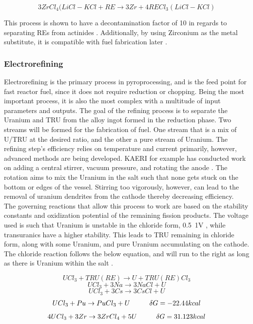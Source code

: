 \[ 3ZrCl_4(LiCl-KCl + RE \rightarrow 3Zr + 4RECl_3(LiCl-KCl) \]

This process is shown to have a decontamination factor of 10 in regards to separating REs from actinides \cite{sakamura}. Additionally, by using Zirconium as the metal substitute, it is compatible with fuel fabrication later \cite{ohta}.
\subsubsection{Electrorefining}
Electrorefining is the primary process in pyroprocessing, and is the feed point for fast reactor fuel, since it does not require reduction or chopping.
Being the most important process, it is also the most complex with a multitude of input parameters and outputs. 
The goal of the refining process is to separate the Uranium and TRU from the alloy ingot formed in the reduction phase.
Two streams will be formed for the fabrication of fuel. One stream that is a mix of U/TRU at the desired ratio, and the other a pure stream of Uranium.
The refining step's efficiency relies on temperature and current primarily, however, advanced methods are being developed.
KAERI for example has conducted work on adding a central stirrer, vacuum pressure, and rotating the anode \cite{lee_advanced}.
The rotation aims to mix the Uranium in the salt such that none gets stuck on the bottom or edges of the vessel. 
Stirring too vigorously, however, can lead to the removal of uranium dendrites from the cathode thereby decreasing efficiency.\\

The governing reactions that allow this process to work are based on the stability constants and oxidization potential of the remaining fission products.
The voltage used is such that Uranium is unstable in the chloride form, 0.5~1V \cite{organisation}, while transuranics have a higher stability. 
This leads to TRU remaining in chloride form, along with some Uranium, and pure Uranium accumulating on the cathode.
The chloride reaction follows the below equation, and will run to the right as long as there is Uranium within the salt \cite{organisation}.

\[ UCl_3+TRU(RE) \rightarrow U + TRU(RE)Cl_3 \]
\[ UCl_3 + 3Na \rightarrow 3NaCl + U \]
\[ UCl_3 + 3Cs \rightarrow 3CsCl + U \]
\[ UCl_3 + Pu \rightarrow PuCl_3 + U \hspace{10mm} \delta G = -22.44kcal \]
\[ 4UCl_3 + 3Zr \rightarrow 3ZrCl_4 + 5U \hspace{10mm} \delta G = 31.123kcal \]

